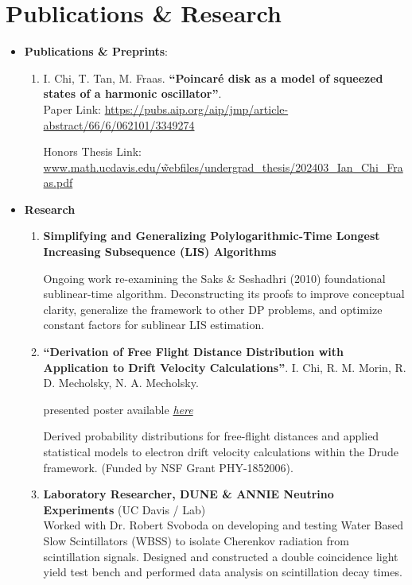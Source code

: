 \documentclass{curriculum-vitae}
\begin{document}
\section{Publications \& Research}
\begin{itemize}
  \item\textbf{Publications \& Preprints}:
    \begin{enumerate}
      \item\label{pub: pub1} I. Chi, T. Tan, M. Fraas. \textbf{``Poincar\'e disk as a model of squeezed states of a harmonic oscillator''}. \\
        Paper Link: \hyperlink{https://pubs.aip.org/aip/jmp/article-abstract/66/6/062101/3349274}{https://pubs.aip.org/aip/jmp/article-abstract/66/6/062101/3349274}

        Honors Thesis Link: \hyperlink{https://tinyurl.com/2pj46txh}{www.math.ucdavis.edu/\~webfiles/undergrad\_thesis/202403\_Ian\_Chi\_Fraas.pdf}



    \end{enumerate}
  \item \textbf{Research}
    \begin{enumerate}
      \item \textbf{Simplifying and Generalizing Polylogarithmic-Time Longest Increasing Subsequence (LIS) Algorithms}

        Ongoing work re-examining the Saks \& Seshadhri (2010) foundational sublinear-time algorithm. Deconstructing its proofs to improve conceptual clarity, generalize the framework to other DP problems, and optimize constant factors for sublinear LIS estimation.
      \item \label{pub: pub2} \textbf{``Derivation of Free Flight Distance Distribution with Application to Drift Velocity Calculations''}. I. Chi, R. M. Morin, R. D. Mecholsky, N. A. Mecholsky.

        presented poster available \href{https://drive.google.com/file/d/1rUFjoE8ORksClzMPz6evIloqEMJk0EOd/view}{\emph{here}}

        Derived probability distributions for free-flight distances and applied statistical models to electron drift velocity calculations within the Drude framework.
        (Funded by NSF Grant PHY-1852006).
      \item \textbf{Laboratory Researcher, DUNE \& ANNIE Neutrino Experiments} (UC Davis / Lab) \\
        Worked with Dr. Robert Svoboda on developing and testing Water Based Slow Scintillators (WBSS) to isolate Cherenkov radiation from scintillation signals. Designed and constructed a double coincidence light yield test bench and performed data analysis on scintillation decay times.
    \end{enumerate}

\end{itemize}
\end{document}
